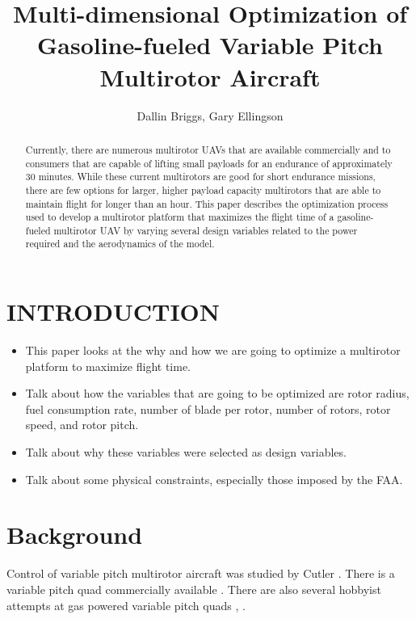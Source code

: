 \documentclass[letterpaper, 10 pt, conference]{ieeeconf}  %
\title{\LARGE \bf
Multi-dimensional Optimization of Gasoline-fueled Variable Pitch Multirotor Aircraft
}
\author{Dallin Briggs, Gary Ellingson%
}
\begin{document}
\maketitle
\thispagestyle{empty}
\pagestyle{empty}


\begin{abstract}

Currently, there are numerous multirotor UAVs that are available commercially and to consumers that are capable of lifting small payloads for an endurance of approximately 30 minutes. While these current multirotors are good for short endurance missions, there are few options for larger, higher payload capacity multirotors that are able to maintain flight for longer than an hour. This paper describes the optimization process used to develop a multirotor platform that maximizes the flight time of a gasoline-fueled multirotor UAV by varying several design variables related to the power required and the aerodynamics of the model.

\end{abstract}


\section{INTRODUCTION}

\begin{itemize}
	\item{This paper looks at the why and how we are going to optimize a multirotor platform to maximize flight time.}
	\item{Talk about how the variables that are going to be optimized are rotor radius, fuel consumption rate, number of blade per rotor, number of rotors, rotor speed, and rotor pitch.}
	\item{Talk about why these variables were selected as design variables.}
	\item{Talk about some physical constraints, especially those imposed by the FAA.}
\end{itemize}


\section{Background}

Control of variable pitch multirotor aircraft was studied by Cutler \cite{Cutler2012}. There is a variable pitch quad commercially available \cite{stingray2016}.  There are also several hobbyist attempts at gas powered variable pitch quads \cite{diy2016}, \cite{hackaday2016}.
\end{document}
